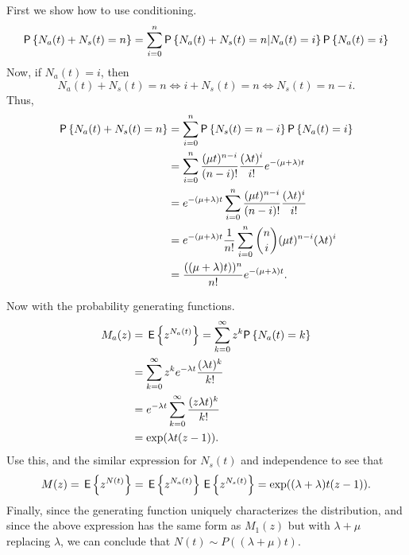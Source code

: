 \begin{question}
    \begin{solution}
First we show how to  use conditioning. 
  \begin{equation*}
    \begin{split}
\P{N_a(t) + N_s(t) = n} 
&= \sum_{i=0}^n \P{N_a(t) + N_s(t) = n|N_a(t) = i}\P{N_a(t)=i} \\
\end{split}
\end{equation*}
Now, if $N_a(t)=i$, then 
\begin{equation*}
N_a(t)+N_s(t) = n \iff 
i+N_s(t) = n \iff 
N_s(t) = n-i.
\end{equation*}
Thus,
  \begin{equation}\label{eq:002}
    \begin{split}
\P{N_a(t) + N_s(t) = n} 
&= \sum_{i=0}^n \P{ N_s(t) = n-i}\P{N_a(t)=i} \\
&= \sum_{i=0}^n \frac{(\mu t)^{n-i}}{(n-i)!} \frac{(\lambda t)^i}{i!} e^{-(\mu+\lambda)t} \\
&= e^{-(\mu+\lambda)t} \sum_{i=0}^n \frac{(\mu t)^{n-i}}{(n-i)!} \frac{(\lambda t)^i}{i!}  \\
&= e^{-(\mu+\lambda)t}\frac 1{n!} \sum_{i=0}^n {n \choose i }(\mu t)^{n-i}(\lambda t)^i  \\
&= \frac{((\mu+\lambda)t))^n}{n!}e^{-(\mu+\lambda)t}.
    \end{split}
  \end{equation}

Now   with the probability generating functions.
      \begin{equation*}
        \begin{split}
          M_a(z) 
&= \E{z^{N_a(t)}} = \sum_{k=0}^\infty z^k \P{N_a(t) = k} \\
&= \sum_{k=0}^\infty z^k e^{-\lambda t} \frac{(\lambda t)^k}{k!} \\
&= e^{-\lambda t} \sum_{k=0}^\infty  \frac{(z \lambda t)^k}{k!} \\
&=\exp(\lambda t (z-1)). 
        \end{split}
      \end{equation*}
      Use this, and the similar expression for $N_s(t)$ and
      independence to see that
\begin{equation*}
M(z) = \,\mathsf{E}\left\{z^{N(t)}\right\} = \,\mathsf{E}\left\{z^{N_a(t)}\right\} \,\mathsf{E}\left\{z^{N_s(t)}\right\} = \exp((\lambda +\lambda)t (z-1)). 
\end{equation*}
Finally, since the  generating function uniquely characterizes
the distribution, and since the above expression has the same form as
$M_1(z)$ but with $\lambda+\mu$ replacing $\lambda$, we can conclude that $N(t)\sim P((\lambda +\mu) t)$.
    \end{solution}
\end{question}


